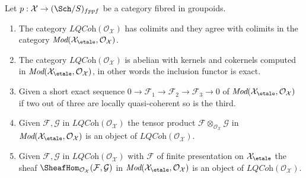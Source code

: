 \begin{lemma}
\label{lemma-lqc-colimits}
Let $p : \mathcal{X} \to (\Sch/S)_{fppf}$ be a category fibred in
groupoids.
\begin{enumerate}
\item The category $\textit{LQCoh}(\mathcal{O}_\mathcal{X})$
has colimits and they agree with colimits in the category
$\textit{Mod}(\mathcal{X}_\etale, \mathcal{O}_\mathcal{X})$.
\item The category $\textit{LQCoh}(\mathcal{O}_\mathcal{X})$
is abelian with kernels and cokernels computed in
$\textit{Mod}(\mathcal{X}_\etale, \mathcal{O}_\mathcal{X})$,
in other words the inclusion functor is exact.
\item Given a short exact sequence
$0 \to \mathcal{F}_1 \to \mathcal{F}_2 \to \mathcal{F}_3 \to 0$ of
$\textit{Mod}(\mathcal{X}_\etale, \mathcal{O}_\mathcal{X})$
if two out of three are locally quasi-coherent so is the third.
\item Given $\mathcal{F}, \mathcal{G}$ in
$\textit{LQCoh}(\mathcal{O}_\mathcal{X})$
the tensor product $\mathcal{F} \otimes_{\mathcal{O}_\mathcal{X}} \mathcal{G}$
in $\textit{Mod}(\mathcal{X}_\etale, \mathcal{O}_\mathcal{X})$
is an object of $\textit{LQCoh}(\mathcal{O}_\mathcal{X})$.
\item Given $\mathcal{F}, \mathcal{G}$ in
$\textit{LQCoh}(\mathcal{O}_\mathcal{X})$
with $\mathcal{F}$ of finite presentation on
$\mathcal{X}_\etale$ the sheaf
$\SheafHom_{\mathcal{O}_\mathcal{X}}(\mathcal{F}, \mathcal{G})$
in $\textit{Mod}(\mathcal{X}_\etale, \mathcal{O}_\mathcal{X})$
is an object of $\textit{LQCoh}(\mathcal{O}_\mathcal{X})$.
\end{enumerate}
\end{lemma}

